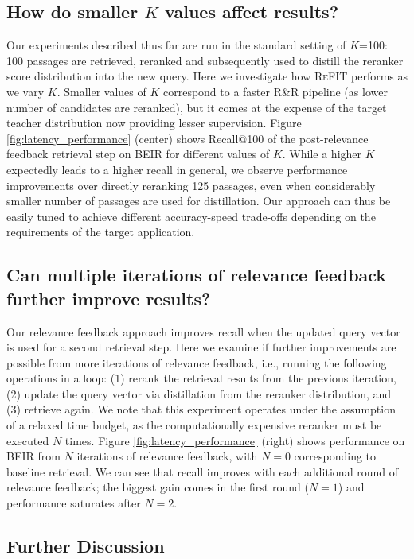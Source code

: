 \subsection{How do smaller $K$ values affect results?}

Our experiments described thus far are run in the standard setting of $K$=100: 100 passages are retrieved, reranked  and subsequently used to distill the reranker score distribution into the new query. Here we investigate how \textsc{ReFIT} performs as we vary $K$. Smaller values of $K$ correspond to a faster R\&R pipeline (as lower number of candidates are reranked), but it comes at the expense of the target teacher distribution now providing lesser supervision.
Figure \ref{fig:latency_performance} (center) shows Recall@100 of the post-relevance feedback retrieval step on BEIR for different values of $K$.
While a higher $K$ expectedly leads to a higher recall in general, we observe performance improvements over directly reranking 125 passages, even when considerably smaller number of passages are used for distillation.
Our approach can thus be easily tuned to achieve different accuracy-speed trade-offs depending on the requirements of the target application.


\subsection{Can multiple iterations of relevance feedback further improve results?}
\label{sec:multi_iterations}
Our relevance feedback approach improves recall when the updated query vector is used for a second retrieval step. 
Here we examine if further improvements are possible from more iterations of relevance feedback, i.e., running the following operations in a loop: (1) rerank the retrieval results from the previous iteration, (2) update the query vector via distillation from the reranker distribution, and (3) retrieve again. We note that this experiment operates under the assumption of a relaxed time budget, as the computationally expensive reranker must be executed $N$ times.
Figure \ref{fig:latency_performance} (right) shows performance on BEIR from $N$ iterations of relevance feedback, with $N=0$ corresponding to baseline retrieval. We can see that recall improves with each additional round of relevance feedback; the biggest gain comes in the first round ($N=1$) and performance saturates after $N=2$.

\subsection{Further Discussion}

